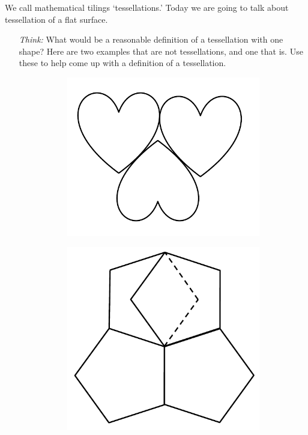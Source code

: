 \documentclass[noauthor,nooutcomes,handout]{../ximera}
\begin{document}
\begin{question}
We call mathematical tilings ‘tessellations.’ Today we are going to talk about tessellation of a flat surface.
\begin{itemize}
 \item[\emph{Think:}] What would be a reasonable definition of a tessellation with one shape? Here are two examples that are not tessellations, and one that is. Use these to help come up with a definition of a tessellation.
 
 \begin{figure}[h]
\centering
\begin{subfigure}[h]{0.3\textwidth}
	\includegraphics[width=\textwidth]{hearts} 
\end{subfigure}
\begin{subfigure}[h]{0.3\textwidth}
	\includegraphics[width=\textwidth]{pentagons}

\end{subfigure}
\end{figure}
\end{itemize}
\end{question}
\end{document}
